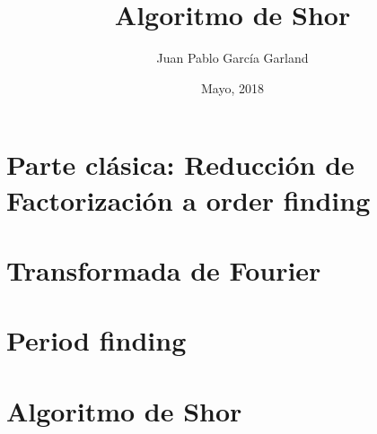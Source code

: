 \documentclass{beamer}
\begin{document}
\title{Algoritmo de Shor} 
\author{Juan Pablo Garc\'ia Garland} 
\date{Mayo, 2018} 

\frame{\titlepage} 



%


\section{Parte cl\'asica: Reducci\'on de Factorizaci\'on a order finding}



\section{Transformada de Fourier}



\section{Period finding}

\section{Algoritmo de Shor}
\frame{}
\end{document}
